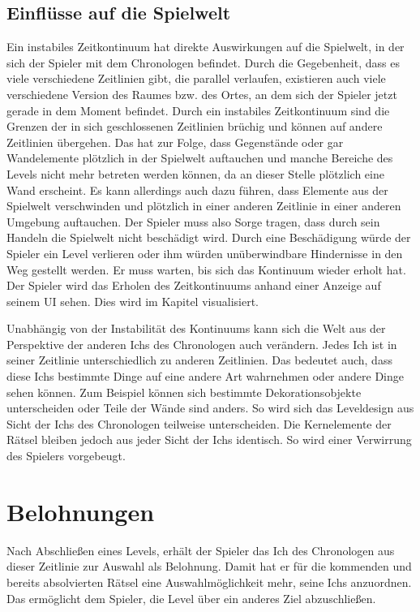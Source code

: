 \subsection{Einflüsse auf die Spielwelt}\label{sec:paradoxon-stability}
Ein instabiles Zeitkontinuum hat direkte Auswirkungen auf die Spielwelt, in der sich der Spieler mit dem Chronologen befindet. Durch die Gegebenheit, dass es viele verschiedene Zeitlinien gibt, die parallel verlaufen, existieren auch viele verschiedene Version des Raumes bzw. des Ortes, an dem sich der Spieler jetzt gerade in dem Moment befindet. Durch ein instabiles Zeitkontinuum sind die Grenzen der in sich geschlossenen Zeitlinien brüchig und können auf andere Zeitlinien übergehen. Das hat zur Folge, dass Gegenstände oder gar Wandelemente plötzlich in der Spielwelt auftauchen und manche Bereiche des Levels nicht mehr betreten werden können, da an dieser Stelle plötzlich eine Wand erscheint. Es kann allerdings auch dazu führen, dass Elemente aus der Spielwelt verschwinden und plötzlich in einer anderen Zeitlinie in einer anderen Umgebung auftauchen. Der Spieler muss also Sorge tragen, dass durch sein Handeln die Spielwelt nicht beschädigt wird. Durch eine Beschädigung würde der Spieler ein Level verlieren oder ihm würden unüberwindbare Hindernisse in den Weg gestellt werden. Er muss warten, bis sich das Kontinuum wieder erholt hat. Der Spieler wird das Erholen des Zeitkontinuums anhand einer Anzeige auf seinem \ac{UI} sehen. Dies wird im Kapitel  visualisiert.

Unabhängig von der Instabilität des Kontinuums kann sich die Welt aus der Perspektive der anderen Ichs des Chronologen auch verändern. Jedes Ich ist in seiner Zeitlinie unterschiedlich zu anderen Zeitlinien. Das bedeutet auch, dass diese Ichs bestimmte Dinge auf eine andere Art wahrnehmen oder andere Dinge sehen können. Zum Beispiel können sich bestimmte Dekorationsobjekte unterscheiden oder Teile der Wände sind anders. So wird sich das Leveldesign aus Sicht der Ichs des Chronologen teilweise unterscheiden. Die Kernelemente der Rätsel bleiben jedoch aus jeder Sicht der Ichs identisch. So wird einer Verwirrung des Spielers vorgebeugt.

\section{Belohnungen}
Nach Abschließen eines Levels, erhält der Spieler das Ich des Chronologen aus dieser Zeitlinie zur Auswahl als Belohnung. Damit hat er für die kommenden und bereits absolvierten Rätsel eine Auswahlmöglichkeit mehr, seine Ichs anzuordnen. Das ermöglicht dem Spieler, die Level über ein anderes Ziel abzuschließen.

